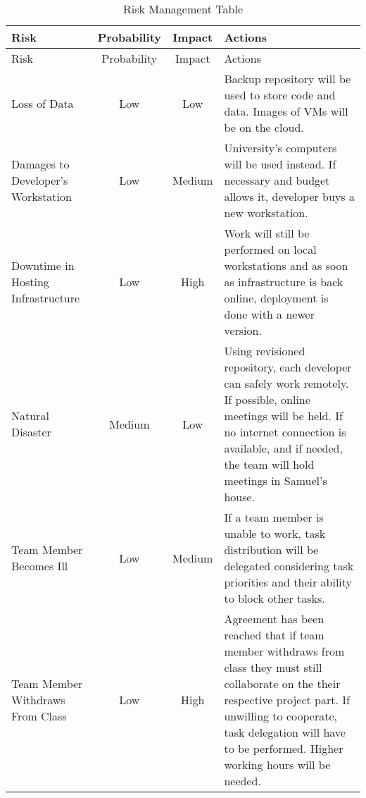 \begin{center}
\setlength{\extrarowheight}{1.5pt}
    \begin{longtable}{|m{5cm}|c|c|m{5cm}|}
 \caption{Risk Management Table} \\
     \hline
    
    \centering  Risk & Probability & Impact & Actions \\
    \hline \hline \endfirsthead
    
         \hline

	\centering  Risk & Probability & Impact & Actions \\    
	\hline \hline \endhead
    
    \endfoot  
Loss of Data    & Low           & Low      & Backup repository will be used to store code and data. Images of VMs will be on the cloud.       \\ \hline
Damages to Developer's Workstation  & Low           & Medium      & University's computers will be used instead. If necessary and budget allows it, developer buys a new workstation.       \\  \hline
    Downtime in Hosting Infrastructure & Low           & High      & Work will still be performed on local workstations and as soon as infrastructure is back online, deployment is done with a newer version.       \\  \hline
    Natural Disaster    & Medium           & Low      & Using revisioned repository, each developer can safely work remotely. If possible, online meetings will be held. If no internet connection is available, and if needed, the team will hold meetings in Samuel's house.       \\  \hline
    Team Member Becomes Ill    & Low           & Medium      & If a team member is unable to work, task distribution will be delegated considering task priorities and their ability to block other tasks.       \\  \hline
    Team Member Withdraws From Class   & Low           & High      & Agreement has been reached that if team member withdraws from class they must still collaborate on the their respective project part. If unwilling to cooperate, task delegation will have to be performed. Higher working hours will be needed.       \\  \hline
\end{longtable}
\end{center}
